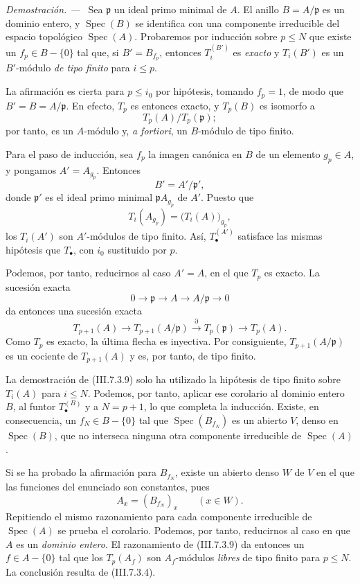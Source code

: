\documentclass[10pt,oneside]{book}
\newcommand{\Spec}{\operatorname{Spec}}
\newcommand{\sref}[2][]{\textup{(#2)}}
\newcommand{\oldpage}[2][]{\setcounter{footnote}{0}\marginpar{\scriptsize\textbf{#1}~|~#2}\ignorespaces}
\newenvironment{proof}{\par\medskip\noindent\textit{Demostración. ---\ }}{\par}
\providecommand{\setmin}{-}%
\begin{document}
\begin{proof}
Sea $\mathfrak p$ un ideal primo minimal de $A$. El anillo
$B=A/\mathfrak p$ es un dominio entero, y $\Spec(B)$ se identifica
con una componente irreducible del espacio topológico $\Spec(A)$.
Probaremos por inducción sobre $p\leq N$ que existe un
$f_p\in B\setmin\{0\}$ tal que, si $B'=B_{f_p}$, entonces
$T_i^{(B')}$ es \emph{exacto} y $T_i(B')$ es un $B'$-módulo \emph{de tipo finito}
para $i\leq p$.

La afirmación es cierta para $p\leq i_0$ por hipótesis, tomando
$f_p=1$, de modo que $B'=B=A/\mathfrak p$. En efecto, $T_p$ es
entonces exacto, y $T_p(B)$ es isomorfo a
\[
  T_p(A)/T_p(\mathfrak p);
\]
por tanto, es un $A$-módulo y, \emph{a fortiori}, un $B$-módulo de
tipo finito.

Para el paso de inducción, sea $f_p$ la imagen canónica en $B$ de un
elemento $g_p\in A$, y pongamos $A'=A_{g_p}$. Entonces
\[
  B'=A'/\mathfrak p',
\]
donde $\mathfrak p'$ es el ideal primo minimal
$\mathfrak pA_{g_p}$ de $A'$. Puesto que
\[
  T_i(A_{g_p})=\bigl(T_i(A)\bigr)_{g_p},
\]
los $T_i(A')$ son $A'$-módulos de tipo finito. Así,
$T_\bullet^{(A')}$ satisface las mismas hipótesis que $T_\bullet$,
con $i_0$ sustituido por $p$.

Podemos, por tanto, reducirnos al caso $A'=A$, en el que $T_p$ es
exacto. La sucesión exacta
\[
  0\longrightarrow\mathfrak p
  \longrightarrow A
  \longrightarrow A/\mathfrak p
  \longrightarrow0
\]
da entonces una sucesión exacta
\[
  T_{p+1}(A)
  \longrightarrow
  T_{p+1}(A/\mathfrak p)
  \xrightarrow{\partial}
  T_p(\mathfrak p)
  \longrightarrow
  T_p(A).
\]
Como $T_p$ es exacto, la última flecha es inyectiva. Por
consiguiente, $T_{p+1}(A/\mathfrak p)$ es un cociente de
$T_{p+1}(A)$ y es, por tanto, de tipo finito.

La demostración de \sref{III.7.3.9} solo ha utilizado la hipótesis
de tipo finito sobre $T_i(A)$ para $i\leq N$. Podemos, por tanto,
aplicar ese corolario al dominio entero $B$, al funtor
$T_\bullet^{(B)}$ y a $N=p+1$, lo que completa la inducción. Existe,
en consecuencia, un $f_N\in B\setmin\{0\}$ tal que $\Spec(B_{f_N})$ es un
abierto $V$, denso en $\Spec(B)$, que no interseca ninguna otra
componente irreducible de $\Spec(A)$.

\oldpage[III]{185}

Si se ha probado la afirmación para $B_{f_N}$, existe un abierto
denso $W$ de $V$ en el que las funciones del enunciado son
constantes, pues
\[
  A_x=(B_{f_N})_x
  \qquad(x\in W).
\]
Repitiendo el mismo razonamiento para cada componente irreducible de
$\Spec(A)$ se prueba el corolario. Podemos, por tanto, reducirnos al
caso en que $A$ es un \emph{dominio entero}. El razonamiento de
\sref{III.7.3.9} da entonces un $f\in A\setmin\{0\}$ tal que los
$T_p(A_f)$ son $A_f$-módulos \emph{libres} de tipo finito para $p\leq N$.
La conclusión resulta de \sref{III.7.3.4}.
\end{proof}
\end{document}

